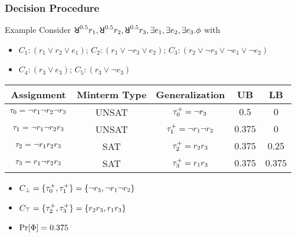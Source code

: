 \begin{frame}
    \frametitle{Decision Procedure}
    \begin{block}{Example}
        Consider $\random{0.5}r_1,\random{0.5}r_2,\random{0.5}r_3,\exists e_1,\exists e_2,\exists e_3.\pf$ with
        \begin{itemize}
            \item[] $C_1: (r_1 \lor r_2 \lor e_1)$; $C_2: (r_1 \lor \lnot r_3 \lor e_2)$; $C_3: (r_2 \lor \lnot r_3 \lor \lnot e_1 \lor \lnot e_2)$
            \item[] $C_4: (r_3 \lor e_3)$; $C_5: (r_3 \lor \lnot e_3)$
        \end{itemize}
        \pause
        \begin{table}[t]
            \centering
            \small
            \begin{tabular}{c|c|c|c|c}
                Assignment                            & Minterm Type & Generalization                & UB      & LB      \\
                \hline
                $\tau_0=\lnot r_1 \lnot r_2 \lnot r_3$ & UNSAT        & $\tau_0^+=\lnot r_3$           & $0.5$   & $0$     \\
                \pause
                $\tau_1=\lnot r_1 \lnot r_2 r_3$       & UNSAT        & $\tau_1^+=\lnot r_1 \lnot r_2$ & $0.375$ & $0$     \\
                \pause
                $\tau_2=\lnot r_1 r_2 r_3$             & SAT          & $\tau_2^+=r_2r_3$              & $0.375$ & $0.25$  \\
                \pause
                $\tau_3=r_1 \lnot r_2 r_3$             & SAT          & $\tau_3^+=r_1r_3$              & $0.375$ & $0.375$
            \end{tabular}
        \end{table}
        \pause
        \begin{itemize}
            \item $C_\bot=\{\tau_0^+,\tau_1^+\}=\{\lnot r_3,\lnot r_1 \lnot r_2\}$
                  \pause
            \item $C_\top=\{\tau_2^+,\tau_3^+\}=\{r_2r_3,r_1r_3\}$
                  \pause
            \item $\Pr[\Phi]=0.375$
        \end{itemize}
    \end{block}
\end{frame}

